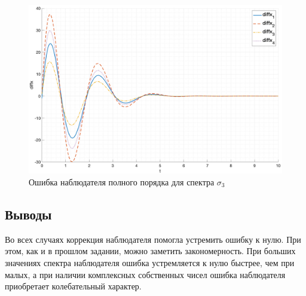\begin{figure}[ht!]
    \centering
    \includegraphics[width=\textwidth]{media/plots/task2_diffx_3.png}
    \caption{Ошибка наблюдателя полного порядка для спектра $\sigma_3$}
    \label{fig:task2_diff_3}
\end{figure}

\FloatBarrier
\subsection{Выводы}
Во всех случаях коррекция наблюдателя помогла устремить ошибку к нулю. При этом, как и в прошлом задании, 
можно заметить закономерность. При больших значениях спектра наблюдателя ошибка устремляется к нулю быстрее, чем при малых, 
а при наличии комплексных собственных чисел ошибка наблюдателя приобретает колебательный характер.